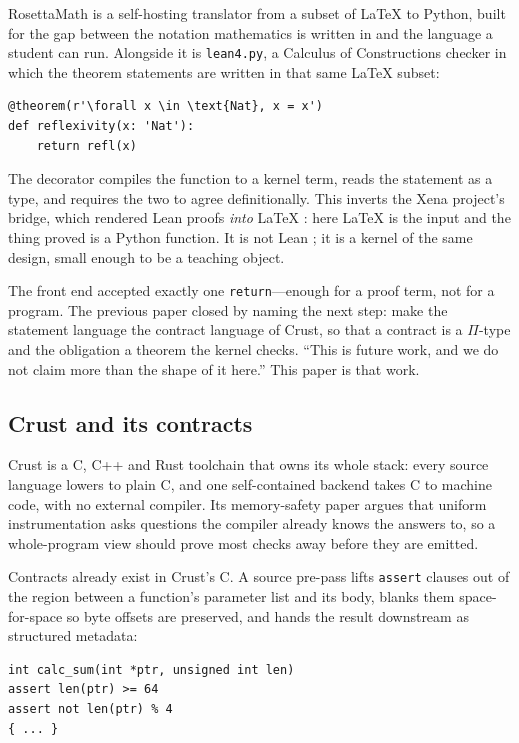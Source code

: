 \documentclass[11pt]{article}
\newcommand{\code}[1]{\texttt{#1}}
\begin{document}
RosettaMath \cite{hartshorn2026rosetta} is a self-hosting translator from a
subset of \LaTeX{} to Python, built for the gap between the notation
mathematics is written in and the language a student can run. Alongside it is
\code{lean4.py}, a Calculus of Constructions \cite{coquand1988} checker in
which the theorem statements are written in that same \LaTeX{} subset:

\begin{lstlisting}
@theorem(r'\forall x \in \text{Nat}, x = x')
def reflexivity(x: 'Nat'):
    return refl(x)
\end{lstlisting}

The decorator compiles the function to a kernel term, reads the statement as a
type, and requires the two to agree definitionally. This inverts the Xena
project's bridge, which rendered Lean proofs \emph{into} \LaTeX{}
\cite{massot2019,massot2024}: here \LaTeX{} is the input and the thing proved
is a Python function. It is not Lean \cite{demoura2021}; it is a kernel of the
same design, small enough to be a teaching object.

The front end accepted exactly one \code{return}---enough for a proof term,
not for a program. The previous paper closed by naming the next step: make the
statement language the contract language of Crust, so that a contract is a
$\Pi$-type and the obligation a theorem the kernel checks. ``This is future
work, and we do not claim more than the shape of it here.'' This paper is that
work.

\subsection{Crust and its contracts}

Crust \cite{hartshorn2026subtraction} is a C, C++ and Rust toolchain that owns
its whole stack: every source language lowers to plain C, and one
self-contained backend takes C to machine code, with no external compiler. Its
memory-safety paper \cite{hartshorn2026memsafe} argues that uniform
instrumentation asks questions the compiler already knows the answers to, so a
whole-program view should prove most checks away before they are emitted.

Contracts already exist in Crust's C. A source pre-pass lifts \code{assert}
clauses out of the region between a function's parameter list and its body,
blanks them space-for-space so byte offsets are preserved, and hands the
result downstream as structured metadata:

\begin{lstlisting}[language=crustc]
int calc_sum(int *ptr, unsigned int len)
assert len(ptr) >= 64
assert not len(ptr) % 4
{ ... }
\end{lstlisting}
\end{document}
